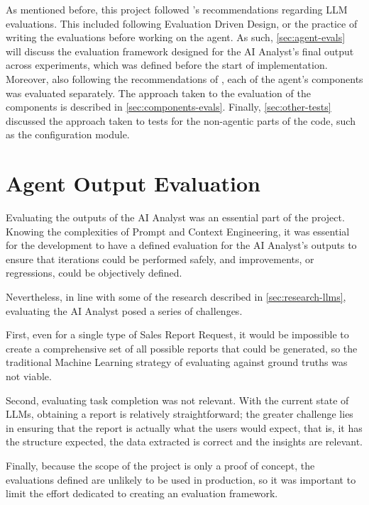 \documentclass[a4paper]{report}
\begin{document}
As mentioned before, this project followed \cite{aiebook2025}'s recommendations regarding LLM evaluations. This included following Evaluation Driven Design, or the practice of writing the evaluations before working on the agent. As such, \autoref{sec:agent-evals} will discuss the evaluation framework designed for the AI Analyst's final output across experiments, which was defined before the start of implementation. Moreover, also following the recommendations of \cite{aiebook2025}, each of the agent's components was evaluated separately. The approach taken to the evaluation of the components is described in \autoref{sec:components-evals}. Finally, \autoref{sec:other-tests} discussed the approach taken to tests for the non-agentic parts of the code, such as the configuration module.

\section{Agent Output Evaluation}
\label{sec:agent-evals}

Evaluating the outputs of the AI Analyst was an essential part of the project. Knowing the complexities of Prompt and Context Engineering, it was essential for the development to have a defined evaluation for the AI Analyst's outputs to ensure that iterations could be performed safely, and improvements, or regressions, could be objectively defined.

Nevertheless, in line with some of the research described in \autoref{sec:research-llms}, evaluating the AI Analyst posed a series of challenges.

First, even for a single type of Sales Report Request, it would be impossible to create a comprehensive set of all possible reports that could be generated, so the traditional Machine Learning strategy of evaluating against ground truths was not viable.

Second, evaluating task completion was not relevant. With the current state of LLMs, obtaining a report is relatively straightforward; the greater challenge lies in ensuring that the report is actually what the users would expect, that is, it has the structure expected, the data extracted is correct and the insights are relevant.

Finally, because the scope of the project is only a proof of concept, the evaluations defined are unlikely to be used in production, so it was important to limit the effort dedicated to creating an evaluation framework.
\end{document}
